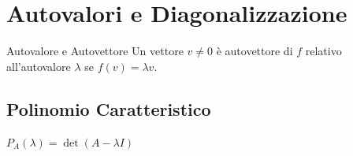 \section{Autovalori e Diagonalizzazione}

\begin{concept}{Autovalore e Autovettore}
Un vettore $v \neq 0$ è autovettore di $f$ relativo all'autovalore $\lambda$ se $f(v) = \lambda v$.
\end{concept}

\subsection{Polinomio Caratteristico}
$P_A(\lambda) = \det(A - \lambda I)$

